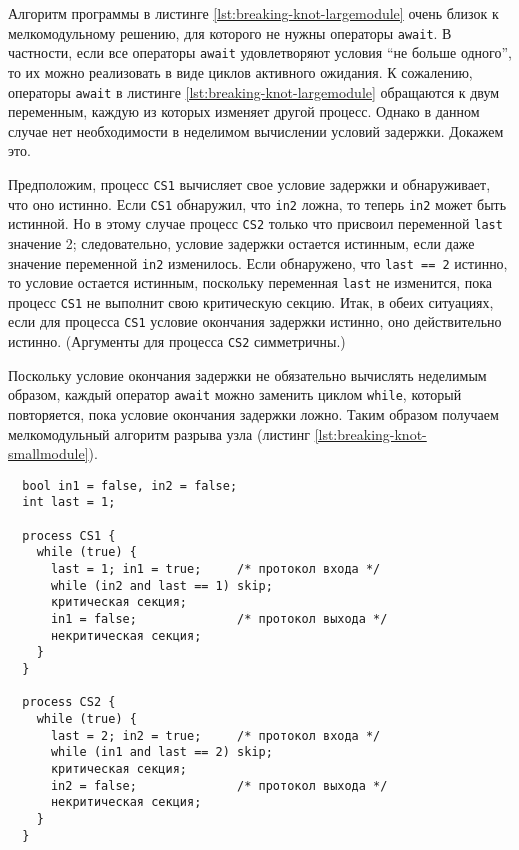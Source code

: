 Алгоритм программы в листинге \ref{lst:breaking-knot-largemodule} очень близок к
мелкомодульному решению, для которого не нужны операторы \texttt{await}. В
частности, если все операторы \texttt{await} удовлетворяют условия ``не больше
одного'', то их можно реализовать в виде циклов активного ожидания. К сожалению,
операторы \texttt{await} в листинге \ref{lst:breaking-knot-largemodule}
обращаются к двум переменным, каждую из которых изменяет другой процесс. Однако
в данном случае нет необходимости в неделимом вычислении условий
задержки. Докажем это.

Предположим, процесс \texttt{CS1} вычисляет свое условие задержки и
обнаруживает, что оно истинно. Если \texttt{CS1} обнаружил, что \texttt{in2}
ложна, то теперь \texttt{in2} может быть истинной. Но в этому случае процесс
\texttt{CS2} только что присвоил переменной \texttt{last} значение 2;
следовательно, условие задержки остается истинным, если даже значение переменной
\texttt{in2} изменилось. Если обнаружено, что \texttt{last == 2} истинно, то
условие остается истинным, поскольку переменная \texttt{last} не изменится, пока
процесс \texttt{CS1} не выполнит свою критическую секцию. Итак, в обеих
ситуациях, если для процесса \texttt{CS1} условие окончания задержки истинно,
оно действительно истинно. (Аргументы для процесса \texttt{CS2} симметричны.)

Поскольку условие окончания задержки не обязательно вычислять неделимым образом,
каждый оператор \texttt{await} можно заменить циклом \texttt{while}, который
повторяется, пока условие окончания задержки ложно. Таким образом получаем
мелкомодульный алгоритм разрыва узла (листинг
\ref{lst:breaking-knot-smallmodule}).

\lstset{label=lst:breaking-knot-smallmodule,
  caption=Алгоритм разрыва узла для двух процессов: мелкомодульное решение}
\begin{lstlisting}
  bool in1 = false, in2 = false;
  int last = 1;

  process CS1 {
    while (true) {
      last = 1; in1 = true;     /* протокол входа */
      while (in2 and last == 1) skip;
      критическая секция;
      in1 = false;              /* протокол выхода */
      некритическая секция;
    }
  }

  process CS2 {
    while (true) {
      last = 2; in2 = true;     /* протокол входа */
      while (in1 and last == 2) skip;
      критическая секция;
      in2 = false;              /* протокол выхода */
      некритическая секция;
    }
  }
\end{lstlisting}

